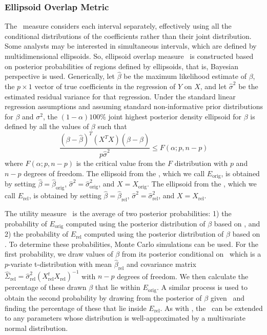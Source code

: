 \documentclass[12pt]{article}
\begin{document}
\subsubsection{Ellipsoid Overlap Metric}\label{subsec.overlap}
The \IO\ measure considers each interval separately, effectively using all
the conditional distributions of the coefficients rather than
their joint distribution. Some analysts may be interested in
simultaneous intervals, which are defined by multidimensional
ellipsoids.  So, ellipsoid overlap measure \EO\ is constructed 
based on  posterior probabilities of regions defined by ellipsoids, that is, 
Bayesian perspective is used.  Generically, let $\hat{\beta}$ be the
maximum likelihood estimate of $\beta$, the $p \times 1$ vector of
true coefficients in the regression of $Y$ on $X$, and let
$\hat{\sigma}^2$ be the estimated residual variance for that
regression. Under the standard linear regression assumptions and
assuming standard non-informative prior distributions for $\beta$
and $\sigma^2$, the $(1-\alpha)100\%$ joint highest posterior
density ellipsoid for $\beta$ is defined by all the values of
$\beta$ such that
\begin{displaymath}\label{eq_1}
\frac{(\beta
-\hat{\beta})^T(X^{T}X)(\beta-\hat{\beta})}{p\hat{\sigma}^2} \leq
F(\alpha;p, n-p)
\end{displaymath}
where $F(\alpha;p, n-p)$ is the critical value from the $F$
distribution with $p$ and $n-p$ degrees of freedom.  The ellipsoid
from the \DBORIG, which we call $E_{\mathrm{orig}}$, is obtained
by setting $\hat{\beta} = \hat{\beta}_{\mathrm{orig}}$,
$\hat{\sigma}^2 = \hat{\sigma}^2_{\mathrm{orig}}$, and $X =
X_{\mathrm{orig}}$. The ellipsoid from the \DBREL, which we call
$E_{\mathrm{rel}}$, is obtained by setting $\hat{\beta} =
\hat{\beta}_{\mathrm{rel}}$, $\hat{\sigma}^2 =
\hat{\sigma}^2_{\mathrm{rel}}$, and $X = X_{\mathrm{rel}}$.

The utility measure \EO\ is the average of two posterior
probabilities: 1) the probability of $E_{\mathrm{orig}}$ computed
using the posterior distribution of $\beta$ based on \DBREL, and
2) the probability of $E_{\mathrm{rel}}$ computed using the
posterior distribution of $\beta$ based on \DBORIG. To determine
these probabilities,  Monte Carlo simulations can be used. For the first
probability, we draw values of $\beta$ from its posterior
conditional on \DBREL\ which is a $p$-variate t-distribution with
mean $\hat{\beta}_{\mathrm{rel}}$ and covariance matrix
$\hat{\Sigma}_{\mathrm{rel}} =
\hat{\sigma}^2_{\mathrm{rel}}(X_{\mathrm{rel}}^{t}X_{\mathrm{rel}})^{-1}$
with $n-p$ degrees of freedom. We then calculate the percentage of
these drawn $\beta$ that lie within $E_{\mathrm{orig}}$.  A
similar process is used to obtain the second probability by
drawing from the posterior of $\beta$ given \DBORIG\ and finding
the percentage of these that lie inside $E_{\mathrm{rel}}$. As
with \IO, the \EO\ can be extended to any parameters whose
distribution is well-approximated by a multivariate normal
distribution.
\end{document}
